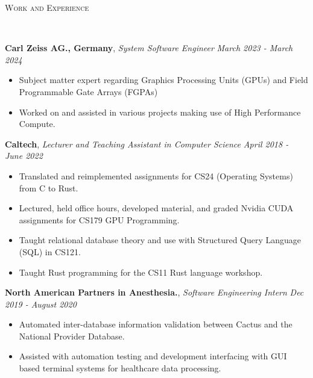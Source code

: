 \documentclass[9pt]{article}
\newenvironment{changemargin}[2]{%
  \begin{list}{}{%
    \setlength{\topsep}{0pt}%
    \setlength{\leftmargin}{#1}%
    \setlength{\rightmargin}{#2}%
    \setlength{\listparindent}{\parindent}%
    \setlength{\itemindent}{\parindent}%
    \setlength{\parsep}{\parskip}%
  }%
  \item[]}{\end{list}
}
\newcommand{\lineover}{
	\begin{changemargin}{-0.05in}{-0.05in}
		\vspace*{-8pt}
		\hrulefill \\
		\vspace*{-2pt}
	\end{changemargin}
}
\newcommand{\header}[1]{
	\begin{changemargin}{-0.5in}{-0.5in}
		\scshape{#1}\\
  	\lineover
	\end{changemargin}
}
\newenvironment{body} {
	\vspace*{-16pt}
	\begin{changemargin}{-0.25in}{-0.5in}
  }	
	{\end{changemargin}
}
\begin{document}
\header{Work and Experience}
\begin{body}
	\vspace{14pt}
	\textbf{Carl Zeiss AG., Germany}, \emph{System Software Engineer} \hfill \emph{March 2023 - March 2024}\\
	\vspace*{-3pt}
	\begin{itemize} \itemsep -0pt %
		\item Subject matter expert regarding Graphics Processing Units (GPUs) and Field Programmable Gate Arrays (FGPAs)
		\item Worked on and assisted in various projects making use of High Performance Compute.
	\end{itemize}
	\vspace*{-2pt}
 
	\textbf{Caltech}, \emph{Lecturer and Teaching Assistant in Computer Science} \hfill \emph{April 2018 - June 2022}\\
	\vspace*{-3pt}
	\begin{itemize} \itemsep -0pt %
		\item Translated and reimplemented assignments for CS24 (Operating
		Systems) from C to Rust.
		\item Lectured, held office hours, developed material, and graded Nvidia CUDA assignments for CS179 GPU Programming.
		\item Taught relational database theory and use with Structured Query Language
		      (SQL) in CS121.
		\item Taught Rust programming for the CS11 Rust language workshop.
	\end{itemize}
	\vspace*{-2pt}

	\textbf{North American Partners in Anesthesia.}, \emph{Software Engineering Intern} \hfill
	\emph{Dec 2019 - August 2020}\\
	\vspace*{-3pt}
	\begin{itemize} \itemsep -0pt %
		\item Automated inter-database information validation between Cactus and the
		      National Provider Database.
		\item Assisted with automation testing and development interfacing with GUI based terminal
		      systems for healthcare data processing.
	\end{itemize}
	\vspace*{-2pt}


\end{body}
\end{document}
